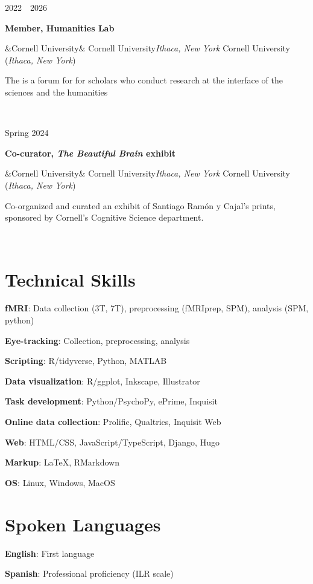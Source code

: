 \documentclass{article}
\newcommand{\entry}[5]{
  \begin{minipage}[t]{.15\textwidth}
    \begin{flushright}
      \hfill {#1} %
    \end{flushright}
  \end{minipage}
  \hfill\vline\hfill
  \begin{minipage}[t]{.80\textwidth}
    \textbf{#2} %

    \ifx&#3&
      {#3}\textit{#4} %
    \else
     {#3 (}\textit{#4}{)}

    \fi
    \footnotesize{#5} %
  \end{minipage}\\\vspace{.25cm}
}
\newcommand{\skillentry}[2]{
  {\hspace{2em}\textbf{#1}:}
  {#2}
  \vspace{.25cm}
}
\newcommand{\cu}{Cornell University}
\let\oldhref\href
\renewcommand{\href}[3][blue]{\oldhref{#2}{\color{#1}{#3}}}
\begin{document}
\entry{2022~\textendash~2026}{Member, Humanities Lab}
{\cu}{Ithaca, New York}
{The \href{https://blogs.cornell.edu/humanitieslab/}{Humanities Lab} is a forum for for scholars who conduct research at the interface of the sciences and the humanities}

\entry{Spring 2024}{Co-curator, \textit{The Beautiful Brain} exhibit}
{\cu}{Ithaca, New York}
{Co-organized and curated an exhibit of Santiago Ramón y Cajal's prints, sponsored by Cornell's Cognitive Science department.}

\section{Technical Skills}

\skillentry{fMRI}
{Data collection (3T, 7T), preprocessing (fMRIprep, SPM), analysis (SPM, python)}

\skillentry{Eye-tracking}{Collection, preprocessing, analysis}

\skillentry{Scripting}{R/tidyverse, Python, MATLAB}

\skillentry{Data visualization}{R/ggplot, Inkscape, Illustrator}

\skillentry{Task development}
{Python/PsychoPy, ePrime, Inquisit}

\skillentry{Online data collection}
{Prolific, Qualtrics, Inquisit Web}

\skillentry{Web}{HTML/CSS, JavaScript/TypeScript, Django, Hugo}

\skillentry{Markup}{\LaTeX, RMarkdown}

\skillentry{OS}{Linux, Windows, MacOS}

\section{Spoken Languages}
\skillentry{English}{First language}

\skillentry{Spanish}{Professional proficiency (ILR scale)}

\raggedleft
\href{https://github.com/opmorgan/cv}{Source code for this CV}
\end{document}
